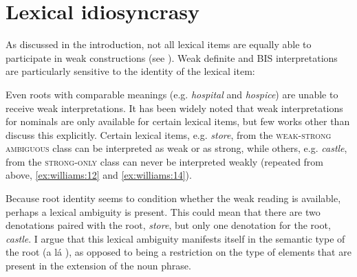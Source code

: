 \documentclass[output=paper,
modfonts
]{langscibook}
\begin{document}
\section{Lexical idiosyncrasy}\label{sec:williams:3}

As discussed in the introduction, not all lexical items are equally able to participate in  weak constructions (see ). Weak definite and BIS interpretations are particularly sensitive to the identity of the lexical item:

 \begin{exe}
\end{exe}

Even roots with comparable meanings (e.g. \textit{hospital} and \textit{hospice}) are unable to receive weak interpretations. It has been widely noted that weak interpretations for nominals are only available for certain lexical items, but few works other than \citet{BaldwinEtAlii2006} discuss this explicitly. Certain lexical items, e.g. \textit{store}, from the \textsc{weak-strong ambiguous} class can be interpreted as weak or as strong, while others, e.g. \textit{castle}, from the \textsc{strong-only} class can never be interpreted weakly (repeated from above, \ref{ex:williams:12} and \ref{ex:williams:14}). 

\begin{exe}
\end{exe}

Because root identity seems to condition whether the weak reading is available, perhaps a lexical ambiguity is present. This could mean that there are two denotations paired with the root, \textit{store}, but only one denotation for the root, \textit{castle}. I argue that this lexical ambiguity manifests itself in the semantic type of the root (a l\'a \citealt{Levinson2014}), as opposed to being a restriction on the type of elements that are present in the extension of the noun phrase. 
\end{document}
